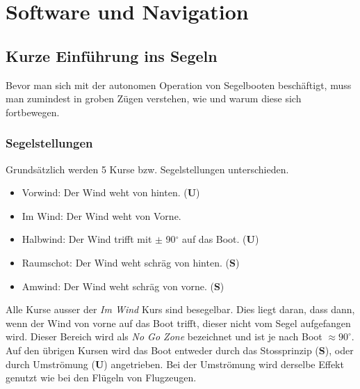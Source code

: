 \chapter{Software und Navigation}
\label{chap:navigation}
\section{Kurze Einführung ins Segeln}
Bevor man sich mit der autonomen Operation von Segelbooten beschäftigt, muss man zumindest in groben Zügen verstehen, wie und warum diese sich fortbewegen.
\subsection{Segelstellungen}
Grundsätzlich werden 5 Kurse bzw. Segelstellungen unterschieden.
\begin{itemize}
    \item Vorwind: Der Wind weht von hinten. (\textbf{U})
    \item Im Wind: Der Wind weht von Vorne.
    \item Halbwind: Der Wind trifft mit  $\pm$ 90$^{\circ}$ auf das Boot. (\textbf{U})
    \item Raumschot: Der Wind weht schräg von hinten. (\textbf{S})
    \item Amwind: Der Wind weht schräg von vorne. (\textbf{S})
\end{itemize}
Alle Kurse ausser der \textit{Im Wind} Kurs sind besegelbar. Dies liegt daran, dass dann, wenn der Wind von vorne auf das Boot trifft, dieser nicht vom Segel aufgefangen wird. Dieser Bereich wird als \textit{No Go Zone} bezeichnet und ist je nach Boot $\approx 90^{\circ}$. Auf den übrigen Kursen wird das Boot entweder durch das Stossprinzip (\textbf{S}), oder durch Umströmung (\textbf{U}) angetrieben. Bei der Umströmung wird derselbe Effekt genutzt wie bei den Flügeln von Flugzeugen. 

